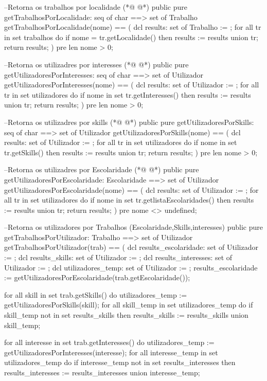 \begin{vdmpp}[breaklines=true]
 --Retorna os trabalhos por localidade
(*@
\label{getTrabalhosPorLocalidade:138}
@*)
 public pure getTrabalhosPorLocalidade: seq of char ==> set of Trabalho
 getTrabalhosPorLocalidade(nome) == (
  dcl results: set of Trabalho := {};
  for all tr in set trabalhos do
   if nome = tr.getLocalidade() then
    results := results union {tr};
  return results;
 )
 pre len nome > 0;
 
 --Retorna os utilizadres por interesses
(*@
\label{getUtilizadoresPorInteresses:149}
@*)
 public pure getUtilizadoresPorInteresses: seq of char ==> set of Utilizador
 getUtilizadoresPorInteresses(nome) == (
  dcl results: set of Utilizador := {};
  for all tr in set utilizadores do
   if nome in set tr.getInteresses() then
    results := results union {tr};
  return results;
 )
 pre len nome > 0;
 
 --Retorna os utilizadres por skills
(*@
\label{getUtilizadoresPorSkills:160}
@*)
 public pure getUtilizadoresPorSkills: seq of char ==> set of Utilizador
 getUtilizadoresPorSkills(nome) == (
  dcl results: set of Utilizador := {};
  for all tr in set utilizadores do
   if nome in set tr.getSkills() then
    results := results union {tr};
  return results;
 )
 pre len nome > 0;

 --Retorna os utilizadres por Escolaridade
(*@
\label{getUtilizadoresPorEscolaridade:171}
@*)
 public pure getUtilizadoresPorEscolaridade: Escolaridade ==> set of Utilizador
 getUtilizadoresPorEscolaridade(nome) == (
  dcl results: set of Utilizador := {};
  for all tr in set utilizadores do
   if nome in set tr.getlistaEscolaridades() then
    results := results union {tr};
  return results;
 )
 pre nome <> undefined;
 
 --Retorna os utilizadores por Trabalhos (Escolaridade,Skills,interesses)
 public pure getTrabalhosPorUtilizador: Trabalho ==> set of Utilizador
 getTrabalhosPorUtilizador(trab) == (
  dcl results_escolaridade: set of Utilizador := {};
  dcl results_skills: set of Utilizador := {};
  dcl results_interesses: set of Utilizador := {};
  dcl utilizadores_temp: set of Utilizador := {};
  results_escolaridade := getUtilizadoresPorEscolaridade(trab.getEscolaridade());
  
  for all skill in set trab.getSkills() do
   utilizadores_temp := getUtilizadoresPorSkills(skill);
   for all skill_temp in set utilizadores_temp do
    if skill_temp not in set results_skills then
     results_skills := results_skills union {skill_temp};
     
  for all interesse in set trab.getInteresses() do
   utilizadores_temp := getUtilizadoresPorInteresses(interesse);
   for all interesse_temp in set utilizadores_temp do
    if interesse_temp not in set results_interesses then
     results_interesses := results_interesses union {interesse_temp};
     

\end{vdmpp}
